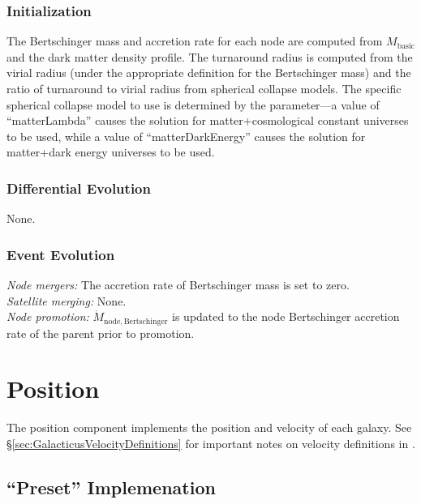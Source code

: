 \subsubsection{Initialization}

The Bertschinger mass and accretion rate for each node are computed from $M_\mathrm{basic}$ and the dark matter density profile. The turnaround radius is computed from the virial radius (under the appropriate definition for the Bertschinger mass) and the ratio of turnaround to virial radius from spherical collapse models. The specific spherical collapse model to use is determined by the {\normalfont \ttfamily [nodeComponentBasicExtendedSphericalCollapseType]} parameter---a value of ``{\normalfont \ttfamily matterLambda}'' causes the solution for matter+cosmological constant universes to be used, while a value of ``{\normalfont \ttfamily matterDarkEnergy}'' causes the solution for matter+dark energy universes to be used.

\subsubsection{Differential Evolution}

None.

\subsubsection{Event Evolution}

\noindent\emph{Node mergers:} The accretion rate of Bertschinger mass is set to zero.\\

\noindent\emph{Satellite merging:} None.\\

\noindent\emph{Node promotion:} $\dot{M}_\mathrm{node, Bertschinger}$ is updated to the \gls{node} Bertschinger accretion rate of the parent prior to promotion.\\

\section{Position}\label{sec:ComponentPosition}

The position \gls{component} implements the position and velocity of each galaxy. See \S\ref{sec:GalacticusVelocityDefinitions} for important notes on velocity definitions in \glc.

\subsection{``Preset'' Implemenation}


